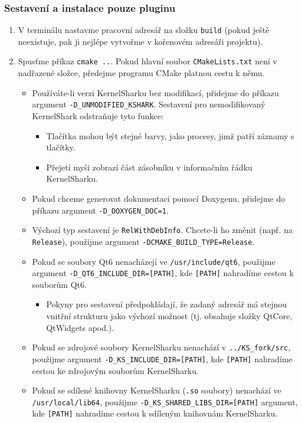 \subsubsection{Sestavení a instalace pouze pluginu}

\begin{enumerate}
  \item V terminálu nastavme pracovní adresář na složku \texttt{build} (pokud ještě neexistuje, pak ji nejlépe vytvořme v kořenovém adresáři projektu).
  \item Spusťme příkaz \texttt{cmake ..}. Pokud hlavní soubor \texttt{CMakeLists.txt} není v nadřazené složce, předejme programu CMake platnou cestu k němu.
    \begin{itemize}
      \item Používáte-li verzi KernelSharku bez modifikací, přidejme do příkazu argument \texttt{-D\_UNMODIFIED\_KSHARK}.
      Sestavení pro nemodifikovaný KernelShark odstraňuje tyto funkce:
      \begin{itemize}
        \item Tlačítka mohou být stejné barvy, jako procesy, jimž patří záznamy s tlačítky.
        \item Přejetí myši zobrazí část zásobníku v informačním řádku KernelSharku.
      \end{itemize}
      \item Pokud chceme generovat dokumentaci pomocí Doxygenu, přidejme do příkazu argument \texttt{-D\_DOXYGEN\_DOC=1}.
      \item Výchozí typ sestavení je \texttt{RelWithDebInfo}. Chcete-li ho změnit (např. na \texttt{Release}), použijme argument \texttt{-DCMAKE\_BUILD\_TYPE=Release}.
      \item Pokud se soubory Qt6 nenacházejí ve \texttt{/usr/include/qt6}, použijme argument \texttt{-D\_QT6\_INCLUDE\_DIR=[PATH]}, kde \texttt{[PATH]} nahradíme cestou k souborům Qt6.
        \begin{itemize}
          \item Pokyny pro sestavení předpokládají, že zadaný adresář má stejnou vnitřní strukturu jako výchozí možnost (tj. obsahuje složky QtCore, QtWidgets apod.).
        \end{itemize}
      \item Pokud se zdrojové soubory KernelSharku nenachází v \texttt{../KS\_fork/src}, použijme argument \texttt{-D\_KS\_INCLUDE\_DIR=[PATH]}, kde \texttt{[PATH]} nahradíme cestou ke zdrojovým souborům KernelSharku.
      \item Pokud se sdílené knihovny KernelSharku (\texttt{.so} soubory) nenachází ve \texttt{/usr/local/lib64}, použijme \texttt{-D\_KS\_SHARED\_LIBS\_DIR=[PATH]} argument, kde \texttt{[PATH]} nahradíme cestou k sdíleným knihovnám KernelSharku.

\end{itemize}
\end{enumerate}
